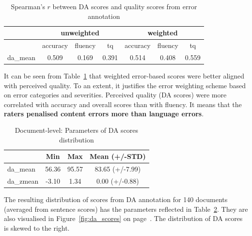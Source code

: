 \begin{table}[H]
	\centering
	\begin{tabular}{l|ccc|ccc}
		\toprule
				& \multicolumn{3}{c|}{unweighted} & \multicolumn{3}{c}{weighted} \\
		\midrule
		& accuracy   & fluency & tq    & accuracy & fluency & tq    \\
		\midrule
		da\_mean & 0.509      & 0.169   & 0.391 & 0.514    & 0.408   & 0.559 \\
		\bottomrule
	\end{tabular}
\caption{\label{tab:doc_err-da_corr}Spearman's $r$ between DA scores and quality scores from error annotation}
\end{table}


It can be seen from Table~\ref{tab:doc_err-da_corr} that weighted error-based scores were better aligned with perceived quality. To an extent, it justifies the error weighting scheme based on error categories and severities. Perceived quality (DA scores) were more correlated with accuracy and overall scores than with fluency. It means that the \textbf{raters penalised content errors more than language errors}. 

\begin{table}[H]
	\centering
	\begin{tabular}{l|ccc}
		\toprule
		& Min   & Max    & Mean (+/-STD)          \\
		\midrule
		da\_mean  & 56.36 & 95.57 & 83.65 (+/-7.99) \\
		da\_zmean & -3.10 & 1.34  & 0.00 (+/-0.88) \\
		\bottomrule
	\end{tabular}
	\caption{\label{tab:doc_da_dist}Document-level: Parameters of DA scores distribution}
\end{table}

The resulting distribution of scores from DA annotation for 140 documents (averaged from sentence scores) has the parameters reflected in Table~\ref{tab:doc_da_dist}. They are also visualised in Figure~\ref{fig:da_scores} on page~\pageref{pg:da_score_hists}. The distribution of DA scores is skewed to the right. 

